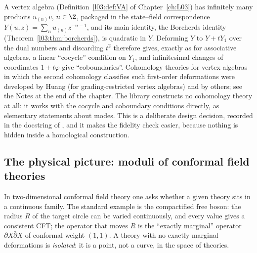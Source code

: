 A vertex algebra (Definition~\ref{l03:def:VA} of Chapter~\ref{ch:L03}) has infinitely many
products $u_{(n)}v$, $n\in\Z$, packaged in the state--field correspondence
$Y(u,z) = \sum_n u_{(n)}z^{-n-1}$, and its main identity, the Borcherds identity
(Theorem~\ref{l03:thm:borcherds}), is quadratic in $Y$. Deforming $Y$ to $Y + tY_1$ over the dual
numbers and discarding $t^2$ therefore gives, exactly as for associative algebras, a linear
``cocycle'' condition on $Y_1$, and infinitesimal changes of coordinates $1 + t\varphi$ give
``coboundaries''. Cohomology theories for vertex algebras in which the second cohomology
classifies such first-order deformations were developed by Huang (for grading-restricted vertex
algebras) and by others; see the Notes at the end of the chapter. The library constructs no
cohomology theory at all: it works with the cocycle and coboundary conditions directly, as
elementary statements about modes. This is a deliberate design decision, recorded in the
docstring of , and it makes the fidelity check easier,
because nothing is hidden inside a homological construction.

\subsection{The physical picture: moduli of conformal field theories}

In two-dimensional conformal field theory one asks whether a given theory sits in a continuous
family. The standard example is the compactified free boson: the radius $R$ of the target circle
can be varied continuously, and every value gives a consistent CFT; the operator that moves $R$ is
the ``exactly marginal'' operator $\partial X\bar\partial X$ of conformal weight $(1,1)$. A theory
with no exactly marginal deformations is \emph{isolated}: it is a point, not a curve, in the space
of theories.

